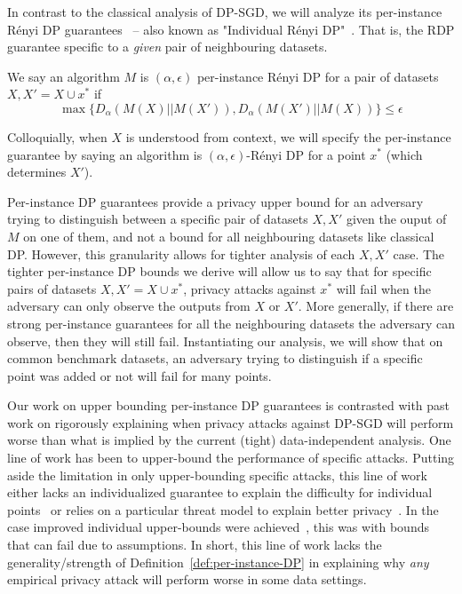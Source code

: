 In contrast to the classical analysis of DP-SGD, we will analyze its per-instance R\'enyi DP guarantees~\citep{wang2019per} -- also known as "Individual R\'enyi DP"~\cite{feldman2021individual}. That is, the RDP guarantee specific to a \textit{given} pair of neighbouring datasets.




\begin{definition}
\label{def:per-instance-DP}
    We say an algorithm $M$ is $(\alpha, \epsilon)$ per-instance R\'enyi DP for a pair of datasets $X,X' = X \cup x^*$ if $$\max \{D_{\alpha}(M(X)||M(X')), D_{\alpha}(M(X')||M(X)) \}  \leq \epsilon$$
\end{definition}

Colloquially, when $X$ is understood from context, we will specify the per-instance guarantee by saying an algorithm is $(\alpha,\epsilon)$-R\'enyi DP for a point $x^*$ (which determines $X'$). 





Per-instance DP guarantees provide a privacy upper bound for an adversary trying to distinguish between a specific pair of datasets $X,X'$ given the ouput of $M$ on one of them, %
and not a bound for all neighbouring datasets like classical DP. However, this granularity allows for tighter analysis of each $X,X'$ case. The tighter per-instance DP bounds we derive will allow us to say that for specific pairs of datasets $X,X' = X \cup x^*$, privacy attacks against $x^*$ will fail when the adversary can only observe the outputs from $X$ or $X'$. More generally, if there are strong per-instance guarantees for all the neighbouring datasets the adversary can observe, then they will still fail. Instantiating our analysis, we will show that on common benchmark datasets, an adversary trying to distinguish if a specific point was added or not will fail for many points. 














Our work on upper bounding per-instance DP guarantees is contrasted with past work on rigorously explaining when privacy attacks against DP-SGD will perform worse than what is implied by the current (tight) data-independent analysis. One line of work has been to upper-bound the performance of specific attacks. Putting aside the limitation in only upper-bounding specific attacks, this line of work either lacks an individualized guarantee to explain the difficulty for individual points~\citep{mahloujifar2022optimal} or relies on a particular threat model to explain better privacy~\citep{thudi2022bounding}. In the case improved individual upper-bounds were achieved~\cite{guo2019certified}, this was with bounds that can fail due to assumptions. In short, this line of work lacks the generality/strength of Definition~\ref{def:per-instance-DP} in explaining why \textit{any} empirical privacy attack will perform worse in some data settings.

